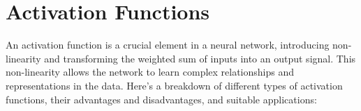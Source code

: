 \section{Activation Functions}
An activation function is a crucial element in a neural network, introducing non-linearity and transforming the weighted sum of inputs into an output signal. This non-linearity allows the network to learn complex relationships and representations in the data. Here's a breakdown of different types of activation functions, their advantages and disadvantages, and suitable applications:
